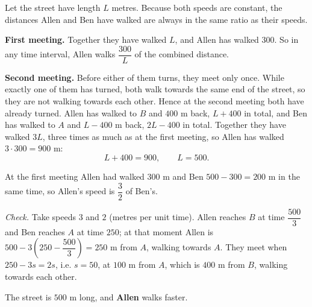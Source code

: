 Let the street have length $L$ metres. Because both speeds are constant, the distances Allen and Ben have walked are always in the same ratio as their speeds.

\textbf{First meeting.} Together they have walked $L$, and Allen has walked $300$. So in any time interval, Allen walks $\dfrac{300}{L}$ of the combined distance.

\textbf{Second meeting.} Before either of them turns, they meet only once. While exactly one of them has turned, both walk towards the same end of the street, so they are not walking towards each other. Hence at the second meeting both have already turned. Allen has walked to $B$ and $400$ m back, $L+400$ in total, and Ben has walked to $A$ and $L-400$ m back, $2L-400$ in total. Together they have walked $3L$, three times as much as at the first meeting, so Allen has walked $3\cdot300=900$ m:
\[L+400=900,\qquad L=500.\]

At the first meeting Allen had walked $300$ m and Ben $500-300=200$ m in the same time, so Allen's speed is $\dfrac32$ of Ben's.

\emph{Check.} Take speeds $3$ and $2$ (metres per unit time). Allen reaches $B$ at time $\dfrac{500}{3}$ and Ben reaches $A$ at time $250$; at that moment Allen is $500-3\left(250-\dfrac{500}{3}\right)=250$ m from $A$, walking towards $A$. They meet when $250-3s=2s$, i.e. $s=50$, at $100$ m from $A$, which is $400$ m from $B$, walking towards each other.

The street is $\boxed{500\text{ m}}$ long, and \textbf{Allen} walks faster.
